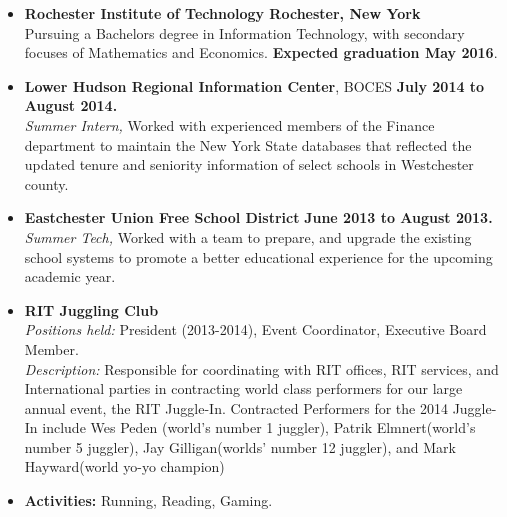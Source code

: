 \documentclass[11pt]{article}
\begin{document}
\vspace{1ex}
\begin{itemize}[topsep=1ex, itemsep=0ex, partopsep=0ex, parsep=1ex]
	\item[]{{\bf Rochester Institute of Technology \hfill Rochester, New York}}\\
Pursuing a Bachelors degree in Information Technology, with secondary focuses of Mathematics and Economics. {\bf Expected graduation May 2016}.
\end{itemize}
\vspace{1ex}
\begin{itemize} [topsep=.3ex, itemsep=0ex, partopsep=0ex, parsep=1ex]
	\item{{\bf Lower Hudson Regional Information Center}, BOCES \hfill {\bf July 2014 to August 2014.}}\\
	{\it Summer Intern,}
	Worked with experienced members of the Finance department to maintain the New York
	State databases that reflected the updated tenure and seniority information of select schools in Westchester county.
	\item{{\bf Eastchester Union Free School District} \hfill { \bf June 2013 to August 2013.}}\\
		{\it Summer Tech,}
		{Worked with a team to prepare, and upgrade the existing school systems to promote a better educational experience for the upcoming academic year.}
\end{itemize}

\vspace{1ex}
\begin{itemize} [topsep=.3ex, itemsep=0ex, partopsep=0ex, parsep=1ex]
	\item[] {\bf RIT Juggling Club}\\
	{\it Positions held:}  President (2013-2014), Event Coordinator, Executive Board Member.\\
	{\it Description:} Responsible for coordinating with RIT offices, RIT services, and International parties in contracting world class performers for our large annual event, the RIT Juggle-In. Contracted Performers for the 2014 Juggle-In include Wes Peden (world's number 1 juggler), Patrik Elmnert(world's number 5 juggler), Jay Gilligan(worlds' number 12 juggler), and Mark Hayward(world yo-yo champion)  	
	\item[] {\bf Activities:} Running, Reading, Gaming.
\end{itemize}
\end{document}

